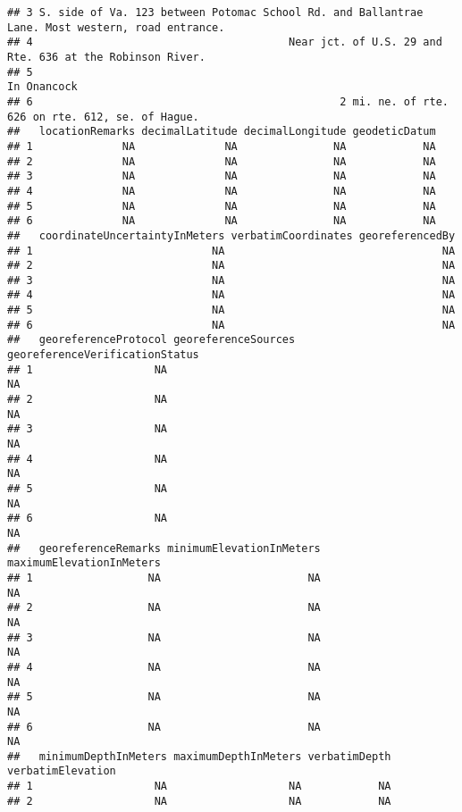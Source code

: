\documentclass[
]{article}
\begin{document}
\begin{verbatim}
## 3 S. side of Va. 123 between Potomac School Rd. and Ballantrae Lane. Most western, road entrance.
## 4                                        Near jct. of U.S. 29 and Rte. 636 at the Robinson River.
## 5                                                                                     In Onancock
## 6                                                2 mi. ne. of rte. 626 on rte. 612, se. of Hague.
##   locationRemarks decimalLatitude decimalLongitude geodeticDatum
## 1              NA              NA               NA            NA
## 2              NA              NA               NA            NA
## 3              NA              NA               NA            NA
## 4              NA              NA               NA            NA
## 5              NA              NA               NA            NA
## 6              NA              NA               NA            NA
##   coordinateUncertaintyInMeters verbatimCoordinates georeferencedBy
## 1                            NA                                  NA
## 2                            NA                                  NA
## 3                            NA                                  NA
## 4                            NA                                  NA
## 5                            NA                                  NA
## 6                            NA                                  NA
##   georeferenceProtocol georeferenceSources georeferenceVerificationStatus
## 1                   NA                                                 NA
## 2                   NA                                                 NA
## 3                   NA                                                 NA
## 4                   NA                                                 NA
## 5                   NA                                                 NA
## 6                   NA                                                 NA
##   georeferenceRemarks minimumElevationInMeters maximumElevationInMeters
## 1                  NA                       NA                       NA
## 2                  NA                       NA                       NA
## 3                  NA                       NA                       NA
## 4                  NA                       NA                       NA
## 5                  NA                       NA                       NA
## 6                  NA                       NA                       NA
##   minimumDepthInMeters maximumDepthInMeters verbatimDepth verbatimElevation
## 1                   NA                   NA            NA                  
## 2                   NA                   NA            NA                  

\end{verbatim}
\end{document}
